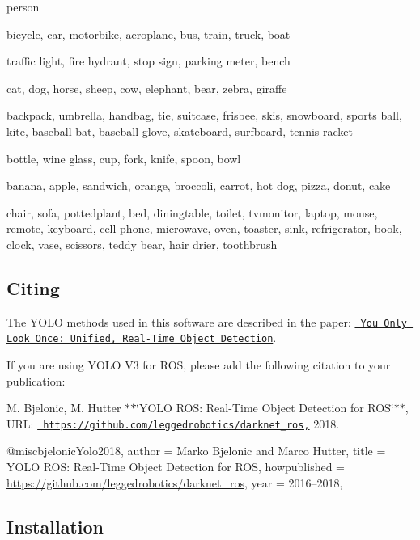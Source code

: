 \begin{DoxyItemize}
\item person
\item bicycle, car, motorbike, aeroplane, bus, train, truck, boat
\item traffic light, fire hydrant, stop sign, parking meter, bench
\item cat, dog, horse, sheep, cow, elephant, bear, zebra, giraffe
\item backpack, umbrella, handbag, tie, suitcase, frisbee, skis, snowboard, sports ball, kite, baseball bat, baseball glove, skateboard, surfboard, tennis racket
\item bottle, wine glass, cup, fork, knife, spoon, bowl
\item banana, apple, sandwich, orange, broccoli, carrot, hot dog, pizza, donut, cake
\item chair, sofa, pottedplant, bed, diningtable, toilet, tvmonitor, laptop, mouse, remote, keyboard, cell phone, microwave, oven, toaster, sink, refrigerator, book, clock, vase, scissors, teddy bear, hair drier, toothbrush
\end{DoxyItemize}

\subsection*{Citing}

The Y\+O\+LO methods used in this software are described in the paper\+: \href{https://arxiv.org/abs/1506.02640}{\texttt{ You Only Look Once\+: Unified, Real-\/\+Time Object Detection}}.

If you are using Y\+O\+LO V3 for R\+OS, please add the following citation to your publication\+:

M. Bjelonic, M. Hutter $\ast$$\ast$\char`\"{}\+Y\+O\+L\+O R\+O\+S\+: Real-\/\+Time Object Detection for R\+O\+S\char`\"{}$\ast$$\ast$, U\+RL\+: \href{https://github.com/leggedrobotics/darknet_ros,}{\texttt{ https\+://github.\+com/leggedrobotics/darknet\+\_\+ros,}} 2018. \begin{DoxyVerb}@misc{bjelonicYolo2018,
  author = {Marko Bjelonic and Marco Hutter},
  title = {{YOLO ROS}: Real-Time Object Detection for {ROS}},
  howpublished = {\url{https://github.com/leggedrobotics/darknet_ros}},
  year = {2016--2018},
}
\end{DoxyVerb}


\subsection*{Installation}

